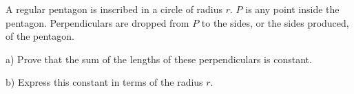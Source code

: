 A regular pentagon is inscribed in a circle of radius $r$. $P$ is any point inside the pentagon. Perpendiculars are dropped from $P$ to the sides, or the sides produced, of the pentagon.

a) Prove that the sum of the lengths of these perpendiculars is constant.

b) Express this constant in terms of the radius $r$.